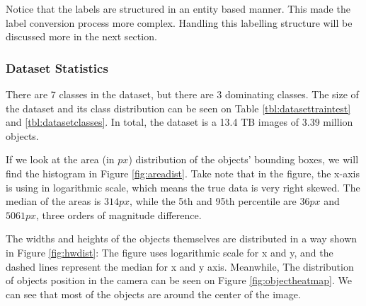   Notice that the labels are structured in an entity based manner. This made the label conversion process
  more complex. Handling this labelling structure will be discussed more in the next section.

  \subsubsection{Dataset Statistics}
  There are 7 classes in the dataset, but there are 3 dominating classes.
  The size of the dataset and its class distribution can be seen on Table \ref{tbl:datasettraintest} and
  \ref{tbl:datasetclasses}. In total, the dataset is a 13.4 TB images of 3.39 million objects.
  \begin{table}
    \centering
    \label{tbl:datasettraintest}
    
  \end{table}
  \begin{table}
    \centering
    \label{tbl:datasetclasses}
    
  \end{table}

  If we look at the area (in $px$) distribution of the objects' bounding boxes, we will find
  the histogram in Figure \ref{fig:areadist}. Take note that in the figure, the x-axis is 
  using in logarithmic scale, which means the true data is very right skewed.
  The median of the areas is $314 px$, while the 5th and 95th percentile are $36 px$ and $5061 px$, three orders of magnitude difference.


  The widths and heights of the objects themselves are distributed in a way shown in Figure \ref{fig:hwdist}:
  The figure uses logarithmic scale for x and y, and the dashed lines represent the median for x and y axis.
  Meanwhile, The distribution of objects position in the camera can be seen on Figure \ref{fig:objectheatmap}.
  We can see that most of the objects are around the center of the image.

